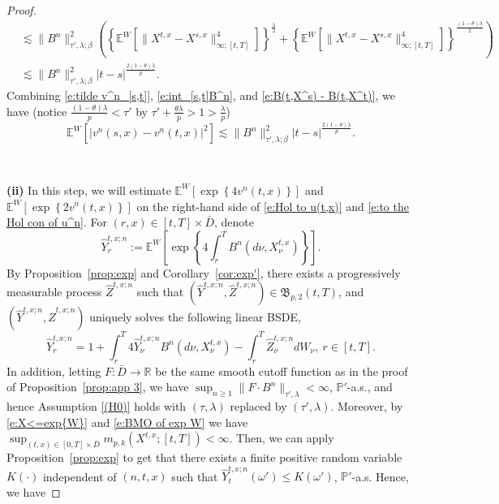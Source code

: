\documentclass[11pt,reqno]{amsart}
\def\R{\mathbb R}
\def\E{\mathbb E}
\numberwithin{equation}{section}
\begin{document}
\begin{proof}
\begin{equation}
\begin{aligned}
&\lesssim \|B^{n}\|^{2}_{\tau',\lambda;\beta}\left(\left\{\E^{W}\left[\|X^{t,x} - X^{s,x}\|^{4}_{\infty;[t,T]}\right]\right\}^{\frac{\lambda}{2}} + \left\{\E^{W}\left[\|X^{t,x} - X^{s,x}\|^{4}_{\infty;[t,T]}\right]\right\}^{\frac{(1-\theta)\lambda}{2}} \right)\\
&\lesssim \|B^{n}\|^{2}_{\tau',\lambda;\beta}|t-s|^{\frac{2(1-\theta)\lambda}{p}}.
\end{aligned}
\end{equation}
Combining  \eqref{e:tilde v^n_[s,t]}, \eqref{e:int_[s,t]B^n}, and \eqref{e:B(t,X^s) - B(t,X^t)}, we have (notice $\frac{(1-\theta)\lambda}{p} < \tau'$ by $ \tau' + \frac{\theta\lambda}{p}>1 > \frac{\lambda}{p}$)
\begin{equation}\label{e:|tilde v^n|^2}
\mathbb{E}^{W}\left[\left|v^{n}(s,x) - v^{n}(t,x)\right|^{2}\right]\lesssim\|B^n\|^2_{\tau',\lambda;\beta} |t-s|^{\frac{2(1-\theta)\lambda}{p}}.
\end{equation}

\ 

{\bf (ii)}
In this step, we will estimate $\mathbb{E}^{W}\left[\exp\left\{4v^{n}(t,x)\right\}\right]$ and $\mathbb{E}^{W}\left[\exp\left\{2v^{n}(t,x)\right\}\right]$ on  the right-hand side of \eqref{e:Hol to u(t,x)} and \eqref{e:to the Hol con of u^n}.
For $(r,x)\in[t,T]\times\bar{D}$, denote
\begin{equation*}
\hat{Y}^{t,x;n}_{r}:=\E^{W}\left[\exp\left\{4\int_{r}^{T}B^{n}(d\nu,X^{t,x}_{\nu})\right\}\right].
\end{equation*}
By Proposition~\ref{prop:exp} and Corollary~\ref{cor:exp'}, there exists a progressively measurable process $\hat{Z}^{t,x;n}$ such that $(\hat{Y}^{t,x;n},\hat{Z}^{t,x;n})\in \mathfrak{B}_{p,2}(t,T)$, and $(\hat{Y}^{t,x;n},\hat{Z}^{t,x;n})$ uniquely solves the following linear BSDE,
\begin{equation*}
\hat{Y}^{t,x;n}_{r} = 1 + \int_{r}^{T}4 \hat{Y}^{t,x;n}_{\nu} B^n(d\nu,X^{t,x}_{\nu}) - \int_{r}^{T}\hat{Z}^{t,x;n}_{\nu} dW_{\nu},\ r\in[t,T].
\end{equation*}
In addition, letting $F:\bar{D}\rightarrow \R$ be the same smooth cutoff function as in the proof of Proposition~\ref{prop:app 3}, we have 
$\sup_{n\ge 1}\|F\cdot B^{n}\|_{\tau',\lambda}<\infty$, $\mathbb{P}'$-a.s., and hence Assumption \ref{(H0)} holds with $(\tau, \lambda)$ 
replaced by $(\tau',\lambda)$. 
Moreover, by \eqref{e:X<=exp{W}} and \eqref{e:BMO of exp W} we have $
\sup_{(t,x)\in[0,T]\times\bar{D}}m_{p,k}(X^{t,x};[t,T])<\infty.$
Then, we can apply Proposition~\ref{prop:exp} to get that there exists a finite positive random variable $K(\cdot)$ independent of $(n,t,x)$ such that  $\hat{Y}^{t,x;n}_{t}(\omega') \le  K(\omega')$, $\mathbb{P}'$-a.s. Hence, we have


\end{proof}
\end{document}
